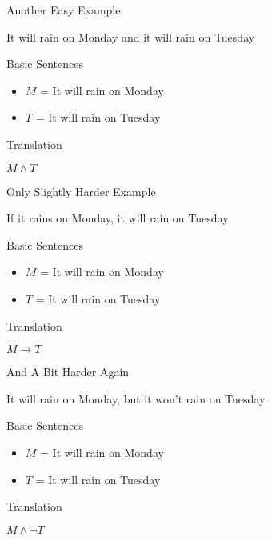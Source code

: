 \documentclass[
  ignorenonframetext,
]{beamer}
\providecommand{\tightlist}{%
  \setlength{\itemsep}{0pt}\setlength{\parskip}{0pt}}
\renewcommand{\,}{\text{, }}
\renewenvironment*{quote}	
	{\list{}{\rightmargin   \leftmargin} \item } 	
	{\endlist }
\begin{document}
\begin{frame}{Another Easy Example}
\protect\hypertarget{another-easy-example}{}

\begin{quote}
It will rain on Monday and it will rain on Tuesday
\end{quote}

Basic Sentences

\begin{itemize}
\tightlist
\item
  \(M\) = It will rain on Monday
\item
  \(T\) = It will rain on Tuesday
\end{itemize}

Translation

\begin{quote}
\(M \wedge T\)
\end{quote}

\end{frame}

\begin{frame}{Only Slightly Harder Example}
\protect\hypertarget{only-slightly-harder-example}{}

\begin{quote}
If it rains on Monday, it will rain on Tuesday
\end{quote}

Basic Sentences

\begin{itemize}
\tightlist
\item
  \(M\) = It will rain on Monday
\item
  \(T\) = It will rain on Tuesday
\end{itemize}

Translation

\begin{quote}
\(M \rightarrow T\)
\end{quote}

\end{frame}

\begin{frame}{And A Bit Harder Again}
\protect\hypertarget{and-a-bit-harder-again}{}

\begin{quote}
It will rain on Monday, but it won't rain on Tuesday
\end{quote}

Basic Sentences

\begin{itemize}
\tightlist
\item
  \(M\) = It will rain on Monday
\item
  \(T\) = It will rain on Tuesday
\end{itemize}

Translation

\begin{quote}
\(M \wedge \neg T\)
\end{quote}

\end{frame}
\end{document}
